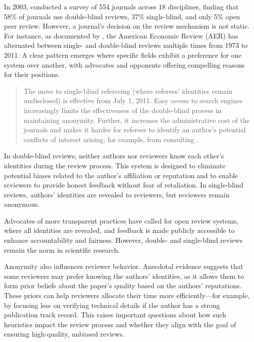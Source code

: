 \documentclass[12pt]{article}
\begin{document}
In 2003, \citet{bachand2003accuracy} conducted a survey of 554 journals across
18 disciplines, finding that 58\% of journals use double-blind reviews, 37\%
single-blind, and only 5\% open peer review. However, a journal's decision on
the review mechanism is not static. For instance, as documented by
\citet{pontille2014blind}, the American Economic Review (AER) has alternated
between single- and double-blind reviews multiple times from 1973 to 2011. A
clear pattern emerges where specific fields exhibit a preference for one system
over another, with advocates and opponents offering compelling reasons for
their positions.

\begin{quote}
    The move to single-blind refereeing (where referees’ identities remain undisclosed) is effective from July 1, 2011. Easy access to search engines increasingly limits the effectiveness of the double-blind process in maintaining anonymity. Further, it increases the administrative cost of the journals and makes it harder for referees to identify an author's potential conflicts of interest arising, for example, from consulting \citep{AER2011}.
\end{quote}

In double-blind reviews, neither authors nor reviewers know each other’s
identities during the review process. This system is designed to eliminate
potential biases related to the author’s affiliation or reputation and to
enable reviewers to provide honest feedback without fear of retaliation. In
single-blind reviews, authors’ identities are revealed to reviewers, but
reviewers remain anonymous.

Advocates of more transparent practices have called for open review systems,
where all identities are revealed, and feedback is made publicly accessible to
enhance accountability and fairness. However, double- and single-blind reviews
remain the norm in scientific research.

Anonymity also influences reviewer behavior. Anecdotal evidence suggests that
some reviewers may prefer knowing the authors’ identities, as it allows them to
form prior beliefs about the paper’s quality based on the authors’ reputations.
These priors can help reviewers allocate their time more efficiently—for
example, by focusing less on verifying technical details if the author has a
strong publication track record. This raises important questions about how such
heuristics impact the review process and whether they align with the goal of
ensuring high-quality, unbiased reviews.
\end{document}
